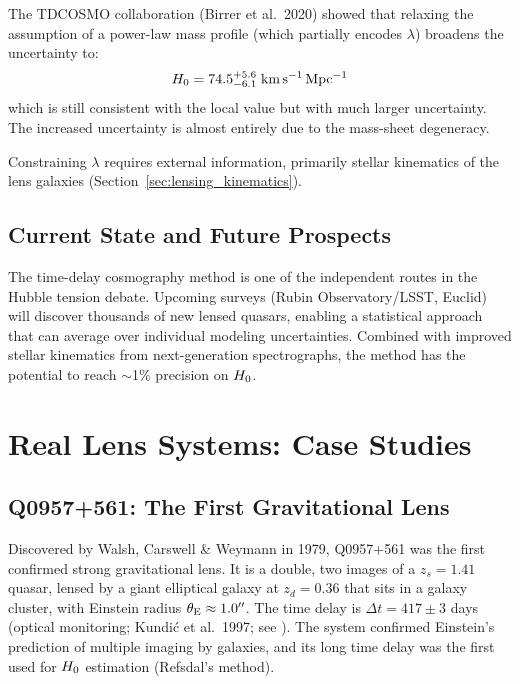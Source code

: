 The TDCOSMO collaboration (Birrer et al.\ 2020) showed that relaxing
the assumption of a power-law mass profile (which partially encodes
$\lambda$) broadens the uncertainty to:
\begin{equation}
    H_0 = 74.5^{+5.6}_{-6.1}
    \;\mathrm{km\,s^{-1}\,Mpc^{-1}}
    \label{eq:TDCOSMO_relaxed}
\end{equation}
which is still consistent with the local value but with much larger
uncertainty.  The increased uncertainty is almost entirely due to
the mass-sheet degeneracy.

Constraining $\lambda$ requires external information, primarily
stellar kinematics of the lens galaxies
(Section~\ref{sec:lensing_kinematics}).

\subsection{Current State and Future Prospects}

The time-delay cosmography method is one of the independent routes
in the Hubble tension debate.  Upcoming surveys (Rubin Observatory/LSST, Euclid)
will discover thousands of new lensed quasars, enabling a
statistical approach that can average over individual modeling
uncertainties.  Combined with improved stellar kinematics from
next-generation spectrographs, the method has the potential to
reach $\sim$1\% precision on $H_0$.


\section{Real Lens Systems: Case Studies}
\label{sec:case_studies}

\subsection{Q0957+561: The First Gravitational Lens}

Discovered by Walsh, Carswell \& Weymann in 1979, Q0957+561 was
the first confirmed strong gravitational lens.  It is a double, two
images of a $z_s = 1.41$ quasar, lensed by a giant elliptical galaxy
at $z_d = 0.36$ that sits in a galaxy cluster, with Einstein radius
$\theta_{\mathrm{E}} \approx 1.0''$.  The time delay is $\Delta t = 417 \pm 3$
days (optical monitoring; Kundi\'c et al.\ 1997; see
\citealp[][Part~1, p.~12]{schneider_kochanek_wambsganss_2006}).  The
system confirmed Einstein's prediction of multiple imaging by
galaxies, and its long time delay was the first used for $H_0$
estimation (Refsdal's method).

